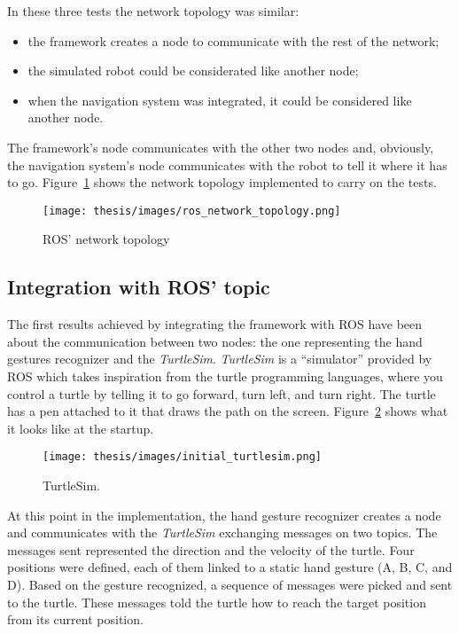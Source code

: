 \documentclass[../thesis.tex]{subfiles}
\begin{document}
In these three tests the network topology was similar:
\begin{itemize}
    \item the framework creates a node to communicate with the rest of the network;
    \item the simulated robot could be considerated like another node;
    \item when the navigation system was integrated, it could be considered like another node.
\end{itemize}

The framework's node communicates with the other two nodes and, obviously, the navigation system's node communicates with the robot to tell it where it has to go. Figure~\ref{fig:ros_network_topology} shows the network topology implemented to carry on the tests.

\begin{figure}[H]
    \centering
    \texttt{[image: thesis/images/ros\_network\_topology.png]}
    \caption{ROS' network topology}
    \label{fig:ros_network_topology}
\end{figure}

\subsection{Integration with ROS' topic}
The first results achieved by integrating the framework with \gls{ROS} have been about the communication between two nodes: the one representing the hand gestures recognizer and the \textit{TurtleSim}. \textit{TurtleSim} is a ``simulator'' provided by \gls{ROS} which takes inspiration from the turtle programming languages, where you control a turtle by telling it to go forward, turn left, and turn right. The turtle has a pen attached to it that draws the path on the screen. Figure~\ref{fig:initial_turtlesim} shows what it looks like at the startup.

\begin{figure}[H]
    \centering
    \texttt{[image: thesis/images/initial\_turtlesim.png]}
    \caption{TurtleSim.}
    \label{fig:initial_turtlesim}
\end{figure}

At this point in the implementation, the hand gesture recognizer creates a node and communicates with the \textit{TurtleSim} exchanging messages on two topics. The messages sent represented the direction and the velocity of the turtle. Four positions were defined, each of them linked to a static hand gesture (A, B, C, and D). Based on the gesture recognized, a sequence of messages were picked and sent to the turtle. These messages told the turtle how to reach the target position from its current position.
\end{document}
